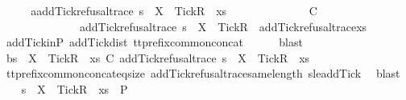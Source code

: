 \isanewline
\ \ \isamarkupfalse%
\ \isamarkupfalse%
\ a{\isacharcolon}{\isachardoublequoteopen}add{\isacharunderscore}Tick{\isacharunderscore}refusal{\isacharunderscore}trace\ s\ {\isacharat}\ {\isacharbrackleft}{\isacharbrackleft}X\ {\isasymunion}\ {\isacharbraceleft}Tick{\isacharbraceright}{\isacharbrackright}\isactrlsub R{\isacharbrackright}\ {\isacharat}\ xs\isanewline
\ \ \ \ \ \ \ \ \ \ \ \ \ \ {\isasymlesssim}\isactrlsub C\isanewline
\ \ \ \ \ \ \ \ \ \ \ \ \ \ add{\isacharunderscore}Tick{\isacharunderscore}refusal{\isacharunderscore}trace\ s\ {\isacharat}\ {\isacharbrackleft}{\isacharbrackleft}X\ {\isasymunion}\ {\isacharbraceleft}Tick{\isacharbraceright}{\isacharbrackright}\isactrlsub R{\isacharbrackright}\ {\isacharat}\ add{\isacharunderscore}Tick{\isacharunderscore}refusal{\isacharunderscore}trace{\isacharparenleft}xs{\isacharparenright}{\isachardoublequoteclose}\isanewline
\ \ \isamarkupfalse%
\ add{\isacharunderscore}Tick{\isacharunderscore}in{\isacharunderscore}P\ add{\isacharunderscore}Tick{\isacharunderscore}dist\ tt{\isacharunderscore}prefix{\isacharunderscore}common{\isacharunderscore}concat\isanewline
\ \ \ \ \isamarkupfalse%
\ blast\isanewline
\ \ \isamarkupfalse%
\ \isamarkupfalse%
\ b{\isacharcolon}{\isachardoublequoteopen}s\ {\isacharat}\ {\isacharbrackleft}{\isacharbrackleft}X\ {\isasymunion}\ {\isacharbraceleft}Tick{\isacharbraceright}{\isacharbrackright}\isactrlsub R{\isacharbrackright}\ {\isacharat}\ xs\ {\isasymlesssim}\isactrlsub C\ add{\isacharunderscore}Tick{\isacharunderscore}refusal{\isacharunderscore}trace\ s\ {\isacharat}\ {\isacharbrackleft}{\isacharbrackleft}X\ {\isasymunion}\ {\isacharbraceleft}Tick{\isacharbraceright}{\isacharbrackright}\isactrlsub R{\isacharbrackright}\ {\isacharat}\ xs{\isachardoublequoteclose}\isanewline
\ \ \ \ \isamarkupfalse%
\ tt{\isacharunderscore}prefix{\isacharunderscore}common{\isacharunderscore}concat{\isacharunderscore}eq{\isacharunderscore}size\ add{\isacharunderscore}Tick{\isacharunderscore}refusal{\isacharunderscore}trace{\isacharunderscore}same{\isacharunderscore}length\ s{\isacharunderscore}le{\isacharunderscore}addTick\ \isamarkupfalse%
\ blast\isanewline
\isanewline
\ \ \isamarkupfalse%
\ {\isachardoublequoteopen}s\ {\isacharat}\ {\isacharbrackleft}{\isacharbrackleft}X\ {\isasymunion}\ {\isacharbraceleft}Tick{\isacharbraceright}{\isacharbrackright}\isactrlsub R{\isacharbrackright}\ {\isacharat}\ xs\ {\isasymin}\ P{\isachardoublequoteclose}\isanewline
